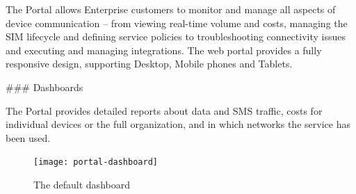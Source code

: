 \documentclass[11pt, oneside]{article}   	%
\newcommand{\addspace}{\vspace{2mm}}
\newcommand{\removespace}{\vspace{-7mm}}
\begin{document}
\begin{markdown}
The Portal allows Enterprise customers to monitor and manage all aspects of device communication -- from viewing real-time volume and costs, managing the SIM lifecycle and defining service policies to troubleshooting connectivity issues and executing and managing integrations. 
The web portal provides a fully responsive design, supporting Desktop, Mobile phones and Tablets.

### Dashboards

The Portal provides detailed reports about data and SMS traffic, costs for individual devices or the full organization, and in which networks the service has been used.

\end{markdown}
\addspace
\begin{figure}[h]
  \texttt{[image: portal-dashboard]}
  \removespace
  \caption{The default dashboard}
\end{figure}
\addspace
\end{document}
